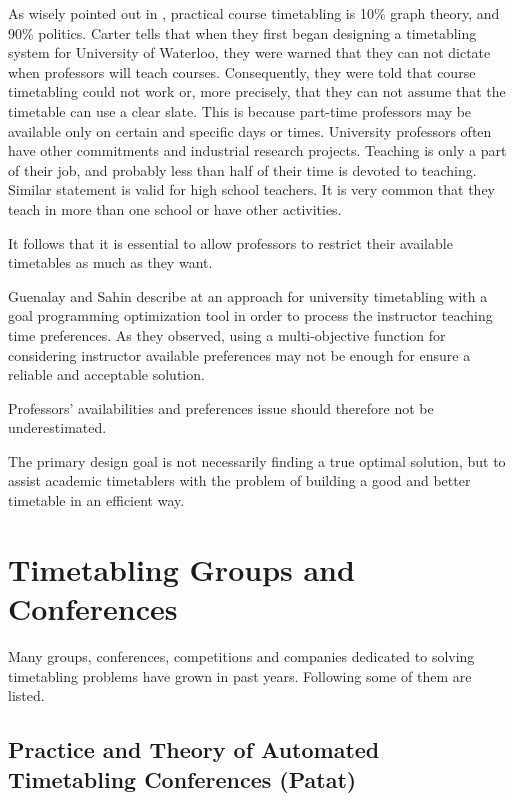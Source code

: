 As wisely pointed out in \cite{Carter2001}, practical course timetabling is 10\% graph theory, and 90\% politics. Carter tells that when they first began designing a timetabling system for University of Waterloo, they were warned that they can not dictate when professors will teach courses. Consequently, they were told that course timetabling could not work or, more precisely, that they can not assume that the timetable can use a clear slate. This is because part-time professors may be available only on certain and specific days or times. University professors often have other commitments and industrial research projects. Teaching is only a part of their job, and probably less than half of their time is devoted to teaching. Similar statement is valid for high school teachers. It is very common that they teach in more than one school or have other activities.

It follows that it is essential to allow professors to restrict their available timetables as much as they want.

Guenalay and Sahin describe at \cite{Guenalay2006} an approach for university timetabling with a goal programming optimization tool in order to process the instructor teaching time preferences. As they observed, using a multi-objective function for considering instructor available preferences may not be enough for ensure a reliable and acceptable solution.

Professors' availabilities and preferences issue should therefore not be underestimated.

The primary design goal is not necessarily finding a true optimal solution, but to assist academic timetablers with the problem of building a good and better timetable in an efficient way.


\section{Timetabling Groups and Conferences}

Many groups, conferences, competitions and companies dedicated to solving timetabling problems have grown in past years. Following some of them are listed.


\subsection{Practice and Theory of Automated Timetabling Conferences (Patat)}
\label{patat}

